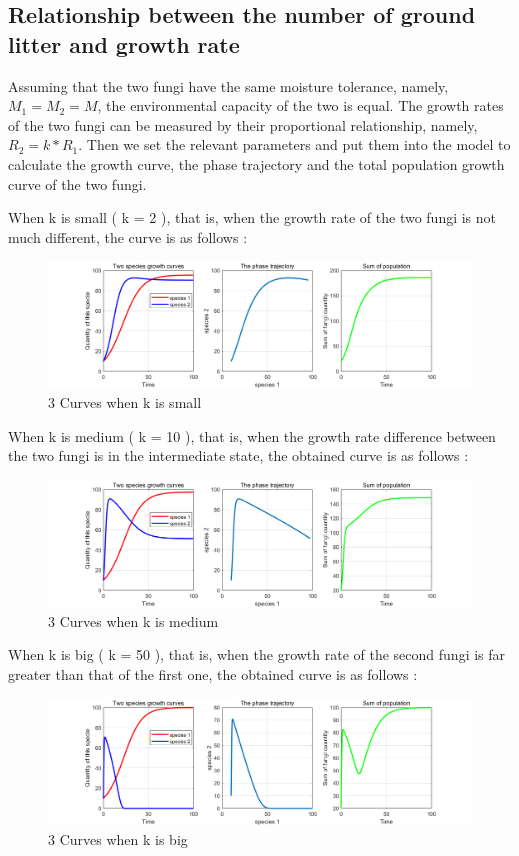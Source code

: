 \documentclass{mcmthesis}
\begin{document}
\subsection{Relationship between the number of ground litter and growth rate}
Assuming that the two fungi have the same moisture tolerance, namely, $ M _ 1 = M _ 2 = M $, the environmental capacity of the two is equal. The growth rates of the two fungi can be measured by their proportional relationship, namely, $ R _ 2 = k * R _ 1 $. Then we set the relevant parameters and put them into the model to calculate the growth curve, the phase trajectory and the total population growth curve of the two fungi.       

When k is small ( k = 2 ), that is, when the growth rate of the two fungi is not much different, the curve is as follows :
\begin{figure}[H]
	\centering
	\includegraphics[width=1.0\textwidth]{img/k较小.png}
	\caption{3 Curves when k is small}\label{fig:k较小}
\end{figure}
When k is medium ( k = 10 ), that is, when the growth rate difference between the two fungi is in the intermediate state, the obtained curve is as follows :
 \begin{figure}[H]
	\centering
	\includegraphics[width=1.0\textwidth]{img/k中等.png}
	\caption{3 Curves when k is medium}\label{fig:k中等}
\end{figure}
When k is big ( k = 50 ), that is, when the growth rate of the second fungi is far greater than that of the first one, the obtained curve is as follows :
\begin{figure}[H]
	\centering
	\includegraphics[width=1.0\textwidth]{img/k较大.png}
	\caption{3 Curves when k is big}\label{fig:k较大}
\end{figure}
\end{document}
